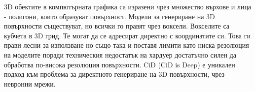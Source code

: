 3D обектите в компютърната графика са изразени чрез множество върхове и лица - полигони, които образуват повърхност. Модели за генериране на 3D повърхности съществуват, но всички го правят чрез воксели. Вокселите са кубчета в 3D грид. Те могат да се адресират директно с координатите си. Това ги прави лесни за използване но също така и поставя лимити като ниска резолюция на моделите поради техническия недостатък на хардуер достатъчно силен да обработва по-висока резолюция повърхности. CiD (CiD is Deep) е уникален подход към проблема за директното генериране на 3D повърхности, чрез невронни мрежи.